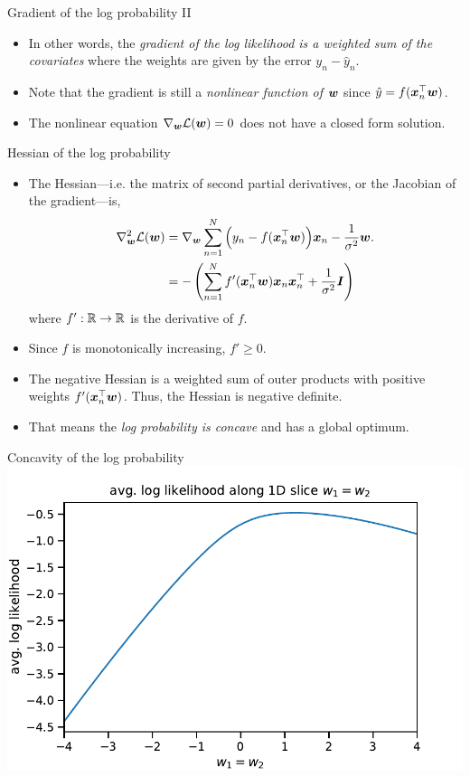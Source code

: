 \documentclass[aspectratio=169]{beamer}
\begin{document}
\begin{frame}{Gradient of the log probability II}
\begin{itemize}
    \item In other words, the \textit{gradient of the log likelihood is a weighted sum of the covariates} where the weights are given by the error $y_n - \hat{y}_n$.
    
    \item Note that the gradient is still a \textit{nonlinear function of $\boldsymbol{w}$} since $\hat{y} = f(\boldsymbol{x}_n^\top \boldsymbol{w})$. 
    
    \item The nonlinear equation $\nabla_{\boldsymbol{w}} \mathcal{L}(\boldsymbol{w}) = 0$ does not have a closed form solution.
\end{itemize}


\end{frame}

\begin{frame}{Hessian of the log probability}

\begin{itemize}
\item The Hessian---i.e. the matrix of second partial derivatives, or the Jacobian of the gradient---is,
\begin{align}
    \nabla_{\boldsymbol{w}}^2 \mathcal{L}(\boldsymbol{w}) &= 
    \nabla_{\boldsymbol{w}} \sum_{n=1}^N \Big(y_n - f(\boldsymbol{x}_n^\top \boldsymbol{w}) \Big) \boldsymbol{x}_n 
    - \frac{1}{\sigma^2} \boldsymbol{w}.
    \\
    &= -\left( \sum_{n=1}^N f'(\boldsymbol{x}_n^\top \boldsymbol{w}) \boldsymbol{x}_n \boldsymbol{x}_n^\top + \frac{1}{\sigma^2} \boldsymbol{I} \right)
\end{align}
where $f': \mathbb{R} \to \mathbb{R}$ is the derivative of $f$. 

\item Since $f$ is monotonically increasing, $f' \geq 0$.

\item The negative Hessian is a weighted sum of outer products with positive weights $f'(\boldsymbol{x}_n^\top \boldsymbol{w})$. Thus, the Hessian is negative definite.

\item That means the \textit{log probability is concave} and has a global optimum.

\end{itemize}
\end{frame}

\begin{frame}{Concavity of the log probability}
    \centering
    \includegraphics[width=.75\textwidth]{figures/lap2/log_joint_1d.pdf}
\end{frame}
\end{document}
